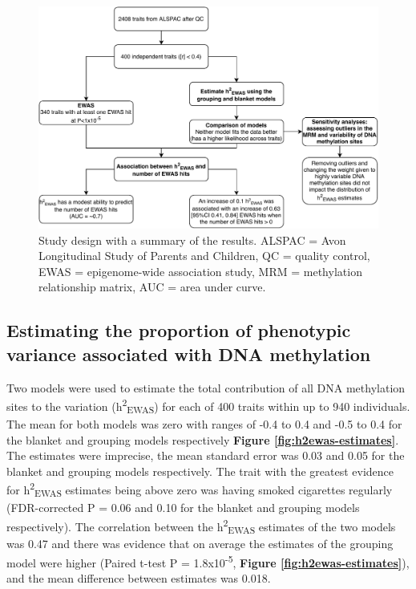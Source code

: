 \documentclass[11pt,oneside]{bristolthesis}
\begin{document}
\begin{figure}

{\centering \includegraphics[width=1\linewidth]{figure/05-h2ewas/m2_workflow} 

}

\caption{Study design with a summary of the results. ALSPAC = Avon Longitudinal Study of Parents and Children, QC = quality control, EWAS = epigenome-wide association study, MRM = methylation relationship matrix, AUC = area under curve.}\label{fig:h2ewas-study-design}
\end{figure}
\hypertarget{estimating-h2ewas}{%
\subsection{Estimating the proportion of phenotypic variance associated with DNA methylation}\label{estimating-h2ewas}}

Two models were used to estimate the total contribution of all DNA methylation sites to the variation (h\textsuperscript{2}\textsubscript{EWAS}) for each of 400 traits within up to 940 individuals. The mean for both models was zero with ranges of -0.4 to 0.4 and -0.5 to 0.4 for the blanket and grouping models respectively \textbf{Figure \ref{fig:h2ewas-estimates}}. The estimates were imprecise, the mean standard error was 0.03 and 0.05 for the blanket and grouping models respectively. The trait with the greatest evidence for h\textsuperscript{2}\textsubscript{EWAS} estimates being above zero was having smoked cigarettes regularly (FDR-corrected P = 0.06 and 0.10 for the blanket and grouping models respectively). The correlation between the h\textsuperscript{2}\textsubscript{EWAS} estimates of the two models was 0.47 and there was evidence that on average the estimates of the grouping model were higher (Paired t-test P = 1.8x10\textsuperscript{-5}, \textbf{Figure \ref{fig:h2ewas-estimates}}), and the mean difference between estimates was 0.018.
\end{document}

